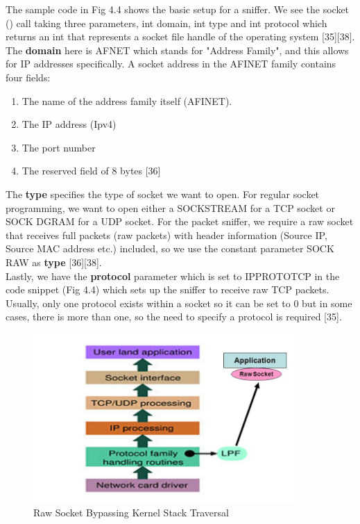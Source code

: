 \documentclass{uathesis}
\begin{document}
The sample code in Fig 4.4 shows the basic setup for a sniffer. We see the socket () call taking three parameters, int domain, int type and int protocol which returns an int that represents a socket file handle of the operating system [35][38]. \\

The \textbf{domain} here is AF\textunderscore NET which stands for "Address Family", and this allows for IP addresses specifically. 
A socket address in the AF\textunderscore INET family contains four fields: 

\begin{enumerate}
     \item The name of the address family itself (AF\textunderscore INET).
     \item The IP address (Ipv4)
     \item The port number
     \item The reserved field of 8 bytes [36] \\
\end{enumerate}

The \textbf{type} specifies the type of socket we want to open. For regular socket programming, we want to open either a SOCK\textunderscore STREAM for a TCP socket or SOCK \textunderscore DGRAM for a UDP socket. For the packet sniffer, we require a raw socket that receives full packets (raw packets) with header information (Source IP, Source MAC address etc.) included, so we use the constant parameter SOCK \textunderscore RAW as  \textbf{type} [36][38]. \\

Lastly, we have the \textbf{protocol} parameter which is set to IPPROTO\textunderscore TCP in the code snippet (Fig 4.4) which sets up the sniffer to receive raw TCP packets. Usually, only one protocol exists within a socket so it can be set to 0 but in some cases, there is more than one, so the need to specify a protocol is required [35].\\

\begin{figure}[h!]
    \centering
    \includegraphics[width=0.9\textwidth]{RawSockT.PNG}
    \caption{Raw Socket Bypassing Kernel Stack Traversal}
    \label{fig: Raw Socket Traversal}
\end{figure}
\end{document}
